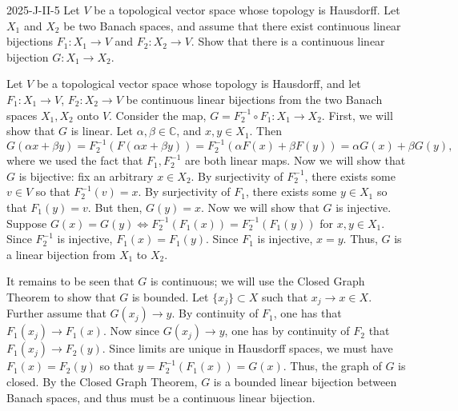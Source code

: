 \documentclass{article}
\begin{document}
	\begin{prb}{2025-J-II-5}
		Let $V$ be a topological vector space whose topology is Hausdorff. Let $X_1$ and $X_2$ be two Banach spaces, and assume that there exist continuous linear bijections $F_1: X_1 \to V$ and $F_2: X_2 \to V$. Show that there is a continuous linear bijection $G: X_1 \to X_2$. 
	\end{prb}
	Let $V$ be a topological vector space whose topology is Hausdorff, and let $F_{1}: X_1 \to V$, $F_2: X_2 \to V$ be continuous linear bijections from the two Banach spaces $X_1, X_2$ onto $V$. Consider the map, $G = F_2^{-1} \circ F_1: X_1 \to X_2$. First, we will show that $G$ is linear. Let $\alpha, \beta \in \mathbb{C}$, and $x, y \in X_1$. Then 
	\begin{equation*}
		G(\alpha x + \beta y) = F_{2}^{-1}(F(\alpha x + \beta y)) = F_{2}^{-1}(\alpha F(x) + \beta F(y)) = \alpha G(x) + \beta G(y), 
	\end{equation*}
	where we used the fact that $F_{1}, F_{2}^{-1}$ are both linear maps. Now we will show that $G$ is bijective: fix an arbitrary $x \in X_2$. By surjectivity of $F_2^{-1}$, there exists some $v \in V$ so that $F_{2}^{-1}(v) = x$. By surjectivity of $F_1$, there exists some $y \in X_1$ so that $F_1(y) = v$. But then, $G(y) = x$. Now we will show that $G$ is injective. Suppose $G(x) = G(y) \iff F_{2}^{-1}(F_{1}(x)) = F_{2}^{-1}(F_{1}(y))$ for $x, y \in X_1$. Since $F_{2}^{-1}$ is injective, $F_1(x) = F_{1}(y)$. Since $F_1$ is injective, $x = y$. Thus, $G$ is a linear bijection from $X_1$ to $X_2$. 
	
	It remains to be seen that $G$ is continuous; we will use the Closed Graph Theorem to show that $G$ is bounded. Let $\{x_{j}\} \subset X$ such that $x_{j} \to x \in X$. Further assume that $G(x_j) \to y$. By continuity of $F_{1}$, one has that $F_{1}(x_j) \to F_1(x)$. Now since $G(x_j) \to y$, one has by continuity of $F_2$ that $F_1(x_j) \to F_2(y)$. Since limits are unique in Hausdorff spaces, we must have $F_1(x) = F_2(y)$ so that $y = F_{2}^{-1}(F_1(x)) = G(x)$. Thus, the graph of $G$ is closed. By the Closed Graph Theorem, $G$ is a bounded linear bijection between Banach spaces, and thus must be a continuous linear bijection. 
	
\end{document}
